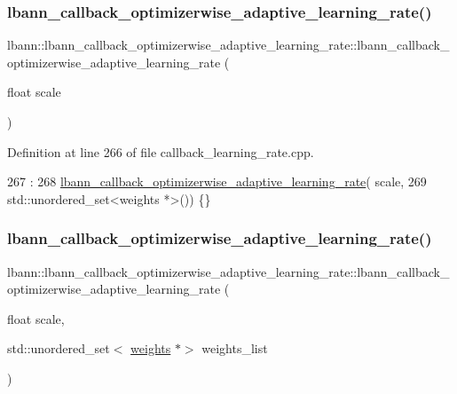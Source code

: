 \subsubsection{\texorpdfstring{lbann\+\_\+callback\+\_\+optimizerwise\+\_\+adaptive\+\_\+learning\+\_\+rate()}{lbann\_callback\_optimizerwise\_adaptive\_learning\_rate()}\hspace{0.1cm}{\footnotesize\ttfamily [1/3]}}
{\footnotesize\ttfamily lbann\+::lbann\+\_\+callback\+\_\+optimizerwise\+\_\+adaptive\+\_\+learning\+\_\+rate\+::lbann\+\_\+callback\+\_\+optimizerwise\+\_\+adaptive\+\_\+learning\+\_\+rate (\begin{DoxyParamCaption}\item[{float}]{scale }\end{DoxyParamCaption})}



Definition at line 266 of file callback\+\_\+learning\+\_\+rate.\+cpp.


\begin{DoxyCode}
267                :
268   \hyperlink{classlbann_1_1lbann__callback__optimizerwise__adaptive__learning__rate_a4ab8768ad85fe17728d62eceb628cc9f}{lbann\_callback\_optimizerwise\_adaptive\_learning\_rate}(
      scale,
269                                                       std::unordered\_set<weights *>()) \{\}
\end{DoxyCode}
\mbox{\label{classlbann_1_1lbann__callback__optimizerwise__adaptive__learning__rate_a0084b1d49e37d5884f5e93455d9aa4b6}} 
\subsubsection{\texorpdfstring{lbann\+\_\+callback\+\_\+optimizerwise\+\_\+adaptive\+\_\+learning\+\_\+rate()}{lbann\_callback\_optimizerwise\_adaptive\_learning\_rate()}\hspace{0.1cm}{\footnotesize\ttfamily [2/3]}}
{\footnotesize\ttfamily lbann\+::lbann\+\_\+callback\+\_\+optimizerwise\+\_\+adaptive\+\_\+learning\+\_\+rate\+::lbann\+\_\+callback\+\_\+optimizerwise\+\_\+adaptive\+\_\+learning\+\_\+rate (\begin{DoxyParamCaption}\item[{float}]{scale,  }\item[{std\+::unordered\+\_\+set$<$ \hyperlink{classlbann_1_1weights}{weights} $\ast$$>$}]{weights\+\_\+list }\end{DoxyParamCaption})}



